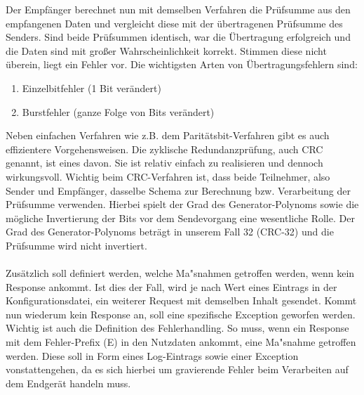 Der Empfänger berechnet nun mit demselben Verfahren die Prüfsumme aus den empfangenen Daten und vergleicht diese mit der übertragenen Prüfsumme des Senders.
Sind beide Prüfsummen identisch, war die Übertragung erfolgreich und die Daten sind mit großer Wahrscheinlichkeit korrekt.
Stimmen diese nicht überein, liegt ein Fehler vor.
Die wichtigsten Arten von Übertragungsfehlern sind:
\begin{enumerate}
    \item Einzelbitfehler (1 Bit verändert)
    \item Burstfehler (ganze Folge von Bits verändert)
\end{enumerate}
Neben einfachen Verfahren wie z.B. dem Paritätsbit-Verfahren gibt es auch effizientere Vorgehensweisen.
Die zyklische Redundanzprüfung, auch \acs{CRC} genannt, ist eines davon.
Sie ist relativ einfach zu realisieren und dennoch wirkungsvoll.
Wichtig beim CRC-Verfahren ist, dass beide Teilnehmer, also Sender und Empfänger, dasselbe Schema zur Berechnung bzw. Verarbeitung der Prüfsumme verwenden.
Hierbei spielt der Grad des Generator-Polynoms sowie die mögliche Invertierung der Bits vor dem Sendevorgang eine wesentliche Rolle.
Der Grad des Generator-Polynoms beträgt in unserem Fall 32 (CRC-32) und die Prüfsumme wird nicht invertiert.\\\\
Zusätzlich soll definiert werden, welche Ma"snahmen getroffen werden, wenn kein Response ankommt.
Ist dies der Fall, wird je nach Wert eines Eintrags in der Konfigurationsdatei, ein weiterer Request mit demselben Inhalt gesendet.
Kommt nun wiederum kein Response an, soll eine spezifische Exception geworfen werden.\\
Wichtig ist auch die Definition des Fehlerhandling.
So muss, wenn ein Response mit dem Fehler-Prefix (E) in den Nutzdaten ankommt, eine Ma"snahme getroffen werden.
Diese soll in Form eines Log-Eintrags sowie einer Exception vonstattengehen, da es sich hierbei um gravierende Fehler beim Verarbeiten auf dem Endgerät handeln muss.
